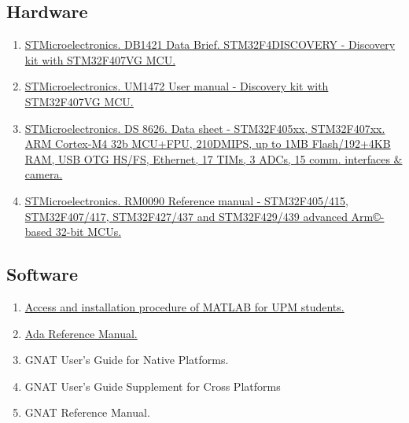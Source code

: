 \subsection*{Hardware}
\begin{enumerate}
\item	\href{https://www.st.com/resource/en/data\_brief/stm32f4discovery.pdf}{STMicroelectronics. DB1421 Data Brief.  STM32F4DISCOVERY - Discovery kit with STM32F407VG MCU.}

\item \href{https://www.st.com/content/ccc/resource/technical/document/user\_manual/70/fe/4a/3f/e7/e1/4f/7d/DM00039084.pdf/files/DM00039084.pdf/jcr:content/translations/en.DM00039084.pdf}{STMicroelectronics. UM1472 User manual - Discovery kit with STM32F407VG MCU.}

\item \href{https://www.st.com/resource/en/datasheet/dm00037051.pdf}{STMicroelectronics. DS 8626. Data sheet - STM32F405xx, STM32F407xx. ARM Cortex-M4 32b MCU+FPU, 210DMIPS, up to 1MB Flash/192+4KB RAM, USB OTG HS/FS, Ethernet, 17 TIMs, 3 ADCs, 15 comm. interfaces \& camera.}

\item \href{https://www.st.com/content/ccc/resource/technical/document/reference\_manual/3d/6d/5a/66/b4/99/40/d4/DM00031020.pdf/files/DM00031020.pdf/jcr:content/translations/en.DM00031020.pdf}{STMicroelectronics. RM0090 Reference manual - STM32F405/415, STM32F407/417, STM32F427/437 and STM32F429/439 advanced Arm\copyright-based 32-bit MCUs.}
\end{enumerate}

\subsection*{Software}

\begin{enumerate}
\item \href{https://www.upm.es/sfs/Rectorado/Vicerrectorado\%20de\%20Tecnologias\%20de\%20la\%20Informacion\%20y\%20Servicios\%20en\%20Red/Servicio\%20de\%20Planificacion\%20Informatica\%20y\%20Comunicaciones/SW/MATLAB\_UPM\_Estudiantes.pdf}{Access and installation procedure of MATLAB for UPM students.}

\item \href{http://www.ada-auth.org/standards/rm12i\_w\_tc1/html/RM-TTL.html}{Ada Reference Manual.}

\item	GNAT User's Guide for Native Platforms.

\item	GNAT User's Guide Supplement for Cross Platforms

\item	GNAT Reference Manual.
\end{enumerate}

